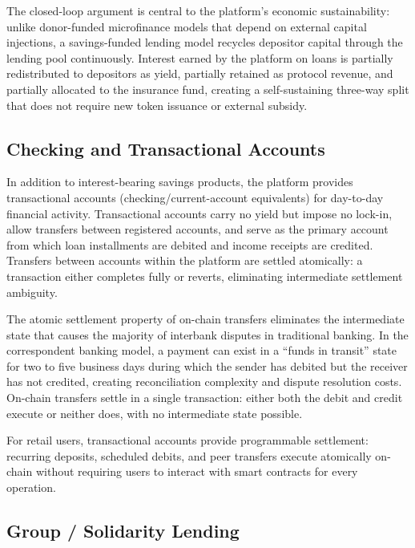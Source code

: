 \documentclass[12pt,a4paper]{report}
\begin{document}
The closed-loop argument is central to the platform's economic sustainability: unlike donor-funded microfinance models that depend on external capital injections, a savings-funded lending model recycles depositor capital through the lending pool continuously. Interest earned by the platform on loans is partially redistributed to depositors as yield, partially retained as protocol revenue, and partially allocated to the insurance fund, creating a self-sustaining three-way split that does not require new token issuance or external subsidy.

\subsection{Checking and Transactional Accounts}

In addition to interest-bearing savings products, the platform provides transactional accounts (checking/current-account equivalents) for day-to-day financial activity. Transactional accounts carry no yield but impose no lock-in, allow transfers between registered accounts, and serve as the primary account from which loan installments are debited and income receipts are credited. Transfers between accounts within the platform are settled atomically: a transaction either completes fully or reverts, eliminating intermediate settlement ambiguity.

The atomic settlement property of on-chain transfers eliminates the intermediate state that causes the majority of interbank disputes in traditional banking. In the correspondent banking model, a payment can exist in a ``funds in transit'' state for two to five business days during which the sender has debited but the receiver has not credited, creating reconciliation complexity and dispute resolution costs. On-chain transfers settle in a single transaction: either both the debit and credit execute or neither does, with no intermediate state possible.

For retail users, transactional accounts provide programmable settlement: recurring deposits, scheduled debits, and peer transfers execute atomically on-chain without requiring users to interact with smart contracts for every operation.

\subsection{Group / Solidarity Lending}
\end{document}
